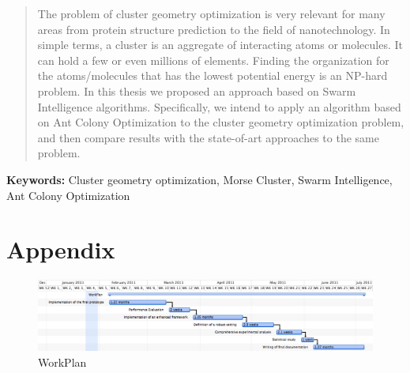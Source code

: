\documentclass[12pt,a4paper]{report}
\begin{document}
	
	
	\begin{abstract}
		The problem of cluster geometry optimization is very relevant for many areas from protein structure prediction to the field of nanotechnology. In simple terms, a cluster is an aggregate of interacting atoms or molecules. It can hold a few or even millions of elements. Finding the organization for the \mbox{atoms/molecules} that has the lowest potential energy is an NP-hard problem. In this thesis we proposed an approach based on Swarm Intelligence algorithms. Specifically, we intend to apply an algorithm based on Ant Colony Optimization to the cluster geometry optimization problem, and then compare results with the state-of-art approaches to the same problem. 
	\end{abstract}
	{\bf Keywords:} Cluster geometry optimization, Morse Cluster, Swarm Intelligence, Ant Colony Optimization
	\tableofcontents
	\listoffigures
	
	
	
	
	
	
	\appendix
	\chapter{Appendix}
	\begin{landscape}
		\begin{figure}
		  \centering
		  \includegraphics[width=1.5\textwidth]{pictures/WorkPlan}%
			\caption{WorkPlan}
			\label{fig:WorkPlan}
		\end{figure}
	\end{landscape}
	
	
	
\end{document}
